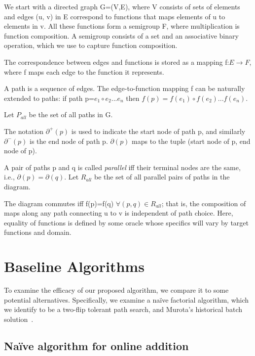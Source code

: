 \documentclass[sigplan,review,anonymous]{acmart}
\begin{document}
We start with a directed graph G=(V,E), where V consists of sets of elements and edges (u, v) in E correspond to functions that maps elements of u to elements in v.
All these functions form a semigroup F, where multiplication is function composition.
A semigroup consists of a set and an associative binary operation, which we use to capture function composition.

The correspondence between edges and functions is stored as a mapping f:$E\rightarrow F$, where f maps each edge to the function it represents.

A path is a sequence of edges. The edge-to-function mapping f can be naturally extended to paths: if path p=$e_1\circ e_2 ... e_n$ then $f(p)=f(e_1) \circ f(e_2) ... f(e_n)$.

Let $P_{all}$ be the set of all paths in G.

The notation $\partial^{+}(p)$ is used to indicate the start node of path p, and similarly $\partial^-(p)$ is the end node of path p.  $\partial(p)$ maps to the tuple (start node of p, end node of p).

A pair of paths p and q is called \textit{parallel} iff their terminal nodes are the same, i.e., $\partial(p)=\partial(q)$.
Let $R_{all}$ be the set of all parallel pairs of paths in the diagram.

The diagram commutes iff f(p)=f(q) $\forall (p,q)\in R_{all}$; that is, the composition of maps along any path connecting u to v is independent of path choice. Here, equality of functions is defined by some oracle whose specifics will vary by target functions and domain.

\section{Baseline Algorithms}

To examine the efficacy of our proposed algorithm, we compare it to some potential alternatives.  Specifically, we examine a na\"{i}ve factorial algorithm, which we identify to be a two-flip tolerant path search, and Murota's historical batch solution~\cite{commutative}.

\subsection{Na\"{i}ve algorithm for online addition}
\end{document}
